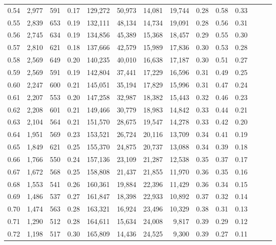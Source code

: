\begin{tabular}{rrrrrrrrrrrrrr}
0.54 &  2,977 &  591 &  0.17 &  129,272 &   50,973 &  14,081 &  19,744 &  0.28 &  0.58 &      0.33 \\
0.55 &  2,839 &  653 &  0.19 &  132,111 &   48,134 &  14,734 &  19,091 &  0.28 &  0.56 &      0.31 \\
0.56 &  2,745 &  634 &  0.19 &  134,856 &   45,389 &  15,368 &  18,457 &  0.29 &  0.55 &      0.30 \\
0.57 &  2,810 &  621 &  0.18 &  137,666 &   42,579 &  15,989 &  17,836 &  0.30 &  0.53 &      0.28 \\
0.58 &  2,569 &  649 &  0.20 &  140,235 &   40,010 &  16,638 &  17,187 &  0.30 &  0.51 &      0.27 \\
0.59 &  2,569 &  591 &  0.19 &  142,804 &   37,441 &  17,229 &  16,596 &  0.31 &  0.49 &      0.25 \\
0.60 &  2,247 &  600 &  0.21 &  145,051 &   35,194 &  17,829 &  15,996 &  0.31 &  0.47 &      0.24 \\
0.61 &  2,207 &  553 &  0.20 &  147,258 &   32,987 &  18,382 &  15,443 &  0.32 &  0.46 &      0.23 \\
0.62 &  2,208 &  601 &  0.21 &  149,466 &   30,779 &  18,983 &  14,842 &  0.33 &  0.44 &      0.21 \\
0.63 &  2,104 &  564 &  0.21 &  151,570 &   28,675 &  19,547 &  14,278 &  0.33 &  0.42 &      0.20 \\
0.64 &  1,951 &  569 &  0.23 &  153,521 &   26,724 &  20,116 &  13,709 &  0.34 &  0.41 &      0.19 \\
0.65 &  1,849 &  621 &  0.25 &  155,370 &   24,875 &  20,737 &  13,088 &  0.34 &  0.39 &      0.18 \\
0.66 &  1,766 &  550 &  0.24 &  157,136 &   23,109 &  21,287 &  12,538 &  0.35 &  0.37 &      0.17 \\
0.67 &  1,672 &  568 &  0.25 &  158,808 &   21,437 &  21,855 &  11,970 &  0.36 &  0.35 &      0.16 \\
0.68 &  1,553 &  541 &  0.26 &  160,361 &   19,884 &  22,396 &  11,429 &  0.36 &  0.34 &      0.15 \\
0.69 &  1,486 &  537 &  0.27 &  161,847 &   18,398 &  22,933 &  10,892 &  0.37 &  0.32 &      0.14 \\
0.70 &  1,474 &  563 &  0.28 &  163,321 &   16,924 &  23,496 &  10,329 &  0.38 &  0.31 &      0.13 \\
0.71 &  1,290 &  512 &  0.28 &  164,611 &   15,634 &  24,008 &   9,817 &  0.39 &  0.29 &      0.12 \\
0.72 &  1,198 &  517 &  0.30 &  165,809 &   14,436 &  24,525 &   9,300 &  0.39 &  0.27 &      0.11 \\

\end{tabular}
